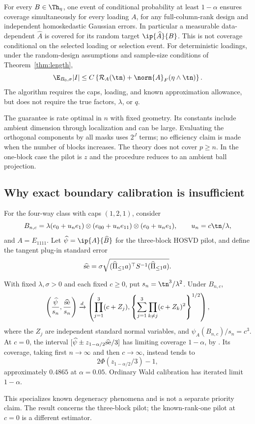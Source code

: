 \begin{theorem}\label{thm:procedure}
For every $B\in\Th_\eta$, one event of conditional probability at least $1-\alpha$ ensures coverage simultaneously for every loading $A$, for any full-column-rank design and independent homoskedastic Gaussian errors. In particular a measurable data-dependent $\widehat A$ is covered for its random target $\ip{\widehat A}{B}$. This is not coverage conditional on the selected loading or selection event. For deterministic loadings, under the random-design assumptions and sample-size conditions of Theorem~\ref{thm:length},
\[
 \E_{B_0,\sigma}|I|\le C\left\{\mathcal R_A(\tn)+\norm{A}_F(\eta\wedge\tn)\right\}.
\]
The algorithm requires the caps, loading, and known approximation allowance, but does not require the true factors, $\lambda$, or $q$.
\end{theorem}

The guarantee is rate optimal in $n$ with fixed geometry. Its constants include ambient dimension through localization and can be large. Evaluating the orthogonal components by all masks uses $2^J$ terms; no efficiency claim is made when the number of blocks increases. The theory does not cover $p\ge n$. In the one-block case the pilot is $z$ and the procedure reduces to an ambient ball projection.

\subsection{Why exact boundary calibration is insufficient}
For the four-way class with caps $(1,2,1)$, consider
\[
 B_{n,c}=\lambda(e_0+u_ne_1)\otimes(e_{00}+u_ne_{11})
                    \otimes(e_0+u_ne_1),\qquad u_n=c\tn/\lambda,
\]
and $A=E_{1111}$. Let $\widehat\psi=\ip{A}{\widehat B}$ for the three-block HOSVD pilot, and define the tangent plug-in standard error
\[
 \widehat{\rm se}=\sigma\sqrt{(\widehat\Pi_{\le1}a)^\top S^{-1}
                                      (\widehat\Pi_{\le1}a)}.
\]
\begin{proposition}\label{prop:wald}
With fixed $\lambda,\sigma>0$ and each fixed $c\ge0$, put $s_n=\tn^3/\lambda^2$. Under $B_{n,c}$,
\[
 \left(\frac{\widehat\psi}{s_n},\frac{\widehat{\rm se}}{s_n}\right)
 \xrightarrow{d}
 \left(\prod_{j=1}^3(c+Z_j),
 \left\{\sum_{j=1}^3\prod_{k\ne j}(c+Z_k)^2\right\}^{1/2}\right),
\]
where the $Z_j$ are independent standard normal variables, and $\psi_A(B_{n,c})/s_n=c^3$. At $c=0$, the interval $[\widehat\psi\pm z_{1-\alpha/2}\widehat{\rm se}/3]$ has limiting coverage $1-\alpha$, by \citet{pillaimeng2016}. Its coverage, taking first $n\to\infty$ and then $c\to\infty$, instead tends to
\[
 2\Phi(z_{1-\alpha/2}/3)-1,
\]
approximately $0.4865$ at $\alpha=0.05$. Ordinary Wald calibration has iterated limit $1-\alpha$.
\end{proposition}
This specializes known degeneracy phenomena and is not a separate priority claim. The result concerns the three-block pilot; the known-rank-one pilot at $c=0$ is a different estimator.
